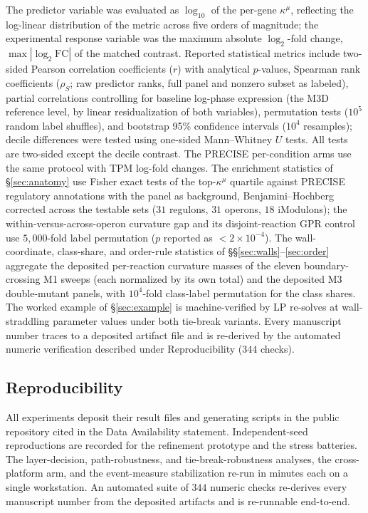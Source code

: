 \documentclass[11pt,a4paper]{article}
\theoremstyle{plain}
\theoremstyle{definition}
\theoremstyle{remark}
\newcommand{\kmu}{\kappa^{\mu}}
\begin{document}
The predictor variable was evaluated as $\log_{10}$ of the per-gene
$\kmu$, reflecting the log-linear distribution of the metric across
five orders of magnitude; the experimental response variable was the
maximum absolute $\log_2$-fold change, $\max|\log_2 \mathrm{FC}|$ of
the matched contrast. Reported statistical metrics include two-sided
Pearson correlation coefficients ($r$) with analytical $p$-values,
Spearman rank coefficients ($\rho_S$; raw predictor ranks, full
panel and nonzero subset as labeled), partial correlations
controlling for baseline log-phase expression (the M3D reference
level, by linear residualization of both variables), permutation
tests ($10^5$ random label shuffles), and bootstrap 95\% confidence
intervals ($10^4$ resamples); decile differences were tested using
one-sided Mann--Whitney $U$ tests. All tests are two-sided except
the decile contrast. The PRECISE per-condition arms use the same
protocol with TPM log-fold changes. The enrichment statistics of
\S\ref{sec:anatomy} use Fisher exact tests of the top-$\kmu$
quartile against PRECISE regulatory annotations with the panel as
background, Benjamini--Hochberg corrected across the testable sets
($31$ regulons, $31$ operons, $18$ iModulons); the
within-versus-across-operon curvature gap and its disjoint-reaction
GPR control use $5{,}000$-fold label permutation ($p$ reported as
$< 2 \times 10^{-4}$). The wall-coordinate, class-share, and
order-rule statistics of \S\S\ref{sec:walls}--\ref{sec:order}
aggregate the deposited per-reaction curvature masses of the eleven
boundary-crossing M1 sweeps (each normalized by its own total) and
the deposited M3 double-mutant panels, with $10^4$-fold class-label
permutation for the class shares. The worked example of
\S\ref{sec:example} is machine-verified by LP re-solves at
wall-straddling parameter values under both tie-break variants.
Every manuscript number traces
to a deposited artifact file and is re-derived by the automated
numeric verification described under Reproducibility
($344$ checks).

\subsection{Reproducibility}

All experiments deposit their result files and generating
scripts in the public repository cited in the Data Availability
statement. Independent-seed reproductions are recorded for the
refinement prototype and the stress batteries. The layer-decision,
path-robustness, and tie-break-robustness analyses, the cross-platform
arm, and the event-measure stabilization re-run in minutes each on a
single workstation. An automated suite of $344$ numeric checks
re-derives every manuscript number from the deposited artifacts and
is re-runnable end-to-end.
\end{document}
